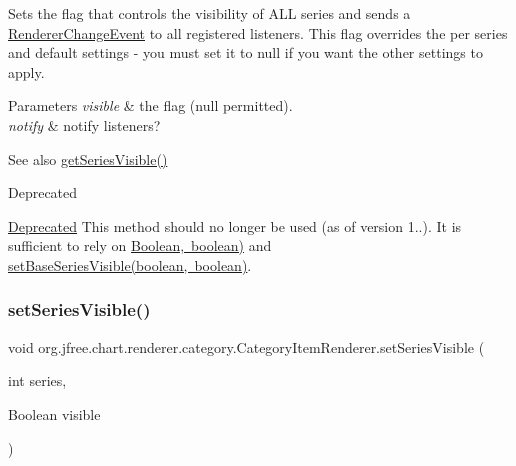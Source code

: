 Sets the flag that controls the visibility of A\+LL series and sends a \mbox{\hyperlink{}{Renderer\+Change\+Event}} to all registered listeners. This flag overrides the per series and default settings -\/ you must set it to {\ttfamily null} if you want the other settings to apply.


\begin{DoxyParams}{Parameters}
{\em visible} & the flag ({\ttfamily null} permitted). \\
\hline
{\em notify} & notify listeners?\\
\hline
\end{DoxyParams}
\begin{DoxySeeAlso}{See also}
\mbox{\hyperlink{interfaceorg_1_1jfree_1_1chart_1_1renderer_1_1category_1_1_category_item_renderer_a0769a384dfe60163122348120d334ccf}{get\+Series\+Visible()}}
\end{DoxySeeAlso}
\begin{DoxyRefDesc}{Deprecated}
\item[\mbox{\hyperlink{deprecated__deprecated000155}{Deprecated}}]This method should no longer be used (as of version 1..). It is sufficient to rely on \mbox{\hyperlink{}{Boolean, boolean)}} and \mbox{\hyperlink{interfaceorg_1_1jfree_1_1chart_1_1renderer_1_1category_1_1_category_item_renderer_a5a7ae2c6a56f613139fa438dd3667854}{set\+Base\+Series\+Visible(boolean, boolean)}}. \end{DoxyRefDesc}
\mbox{\label{interfaceorg_1_1jfree_1_1chart_1_1renderer_1_1category_1_1_category_item_renderer_a929d5c0d5de37983ac3f83b31b3f2abe}} 
\subsubsection{\texorpdfstring{set\+Series\+Visible()}{setSeriesVisible()}\hspace{0.1cm}{\footnotesize\ttfamily [3/4]}}
{\footnotesize\ttfamily void org.\+jfree.\+chart.\+renderer.\+category.\+Category\+Item\+Renderer.\+set\+Series\+Visible (\begin{DoxyParamCaption}\item[{int}]{series,  }\item[{Boolean}]{visible }\end{DoxyParamCaption})}

